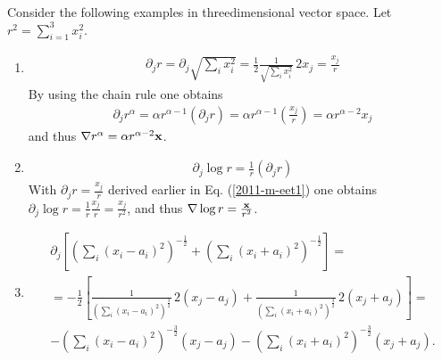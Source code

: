 {
\color{blue}
\bexample

Consider the following examples in threedimensional vector space.
Let $r^2 = \sum_{i=1 }^3 x_i^2$.

\begin{enumerate}
\item
\begin{equation}
\begin{split}
  \partial_jr =  \partial_j \sqrt{\sum_ix_i^2} =
  \frac{1}{2}\frac{1}{\sqrt{\sum_ix_i^2}}\,2x_j =
  \frac{x_j}{r}
\end{split}
\end{equation}
By using the chain  rule one obtains
\begin{equation}
\begin{split}
  \partial_jr^\alpha =
  \alpha r^{\alpha-1}\left(\partial_jr\right) =
  \alpha r^{\alpha-1}\left(\frac{x_j}{r}\right)=
  \alpha r^{\alpha-2}x_j
\end{split}
\label{2011-m-eet1}
\end{equation}
and thus $\nabla r^\alpha = \alpha r^{\alpha-2}{\bf x}$.


\item
\begin{equation}
\begin{split}
  \partial_j \log r=\frac{1}{r}\left(\partial_jr\right)
\end{split}
\end{equation}
With $
  \partial_jr = \frac{x_j}{r}
$  derived earlier in Eq. (\ref{2011-m-eet1}) one obtains
$
 \partial_j \log r= \frac{1}{r}\frac{x_j}{r}=
  \frac{x_j}{r^2}
$,
and thus $\nabla  \log r =\frac{{\bf x}}{r^2}$.

\item
\begin{equation}
\begin{split}
  \partial_j
  \left[
    \left(
      \sum_i\left(x_i-a_i\right)^2
    \right)^{-\frac{1}{2}}+
    \left(
      \sum_i\left(x_i+a_i\right)^2
    \right)^{-\frac{1}{2}}
  \right]=
\\
  = -\frac{1}{2}\left[\frac{1}{\left(\sum_i\left(x_i-a_i\right)^2\right)^
    \frac{3}{2}}\,2\left(x_j-a_j\right)
  +\frac{1}{\left(\sum_i\left(x_i+a_i\right)^2\right)^\frac{3}{2}}\,
    2\left(x_j+a_j\right)\right]= \\
 -\left(\sum_i\left(x_i-a_i\right)^2\right)^{-\frac{3}{2}}\left(x_j-a_j\right)-
    \left(\sum_i\left(x_i+a_i\right)^2\right)^{-\frac{3}{2}}\left(x_j+a_j\right)   .
\end{split}
\end{equation}


\end{enumerate}}

